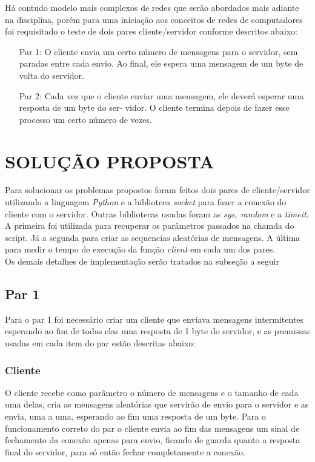 \documentclass[12pt]{article}
\begin{document}
Há contudo modelo mais complexos de redes que serão abordados mais adiante na disciplina,
porém para uma iniciação aos conceitos de redes de computadores foi requisitado o teste de dois pares cliente/servidor
conforme descritos abaixo:
\begin{enumerate}
\item[Par 1:] O cliente envia um certo número de mensagens para o servidor, sem paradas entre cada envio.
Ao final, ele espera uma mensagem de um byte de volta do servidor.\\
\item[Par 2:] Cada vez que o cliente enviar uma mensagem, ele deverá esperar uma resposta de um byte do ser-
vidor.
O cliente termina depois de fazer esse processo um certo número de vezes.
\end{enumerate}

\section{SOLUÇÃO PROPOSTA}
\label{solucao_proposta}

Para solucionar os problemas propostos foram feitos dois pares de cliente/servidor utilizando a linguagem \textit{Python}
e a biblioteca \textit{socket} para fazer a conexão do cliente com o servidor.
Outras bibliotecas usadas foram as \textit{sys, random} e a \textit{timeit}.\\
A primeira foi utilizada para recuperar os parâmetros passados na chamda do script.
Já a segunda para criar as sequencias aleatórias de mensagens. A última
para medir o tempo de execução da função \textit{client} em cada um dos pares.\\
Os demais detalhes de implementação serão tratados na subseção a seguir

\subsection{Par 1}
Para o par 1 foi necessário criar um cliente que enviava mensagens intermitentes esperando ao fim de todas elas
uma resposta de 1 byte do servidor, e as premissas usadas em cada item do par estão descritas abaixo:

\subsubsection{Cliente}
O cliente recebe como parâmetro o número de mensagens e o tamanho de cada uma delas,
cria as mensagens aleatórias que servirão de envio para o servidor e as envia, uma a uma,
esperando ao fim uma resposta de um byte. Para o funcionamento correto do par o cliente envia
ao fim das mensagens um sinal de fechamento da conexão apenas para envio,
ficando de guarda quanto a resposta final do servidor, para só então fechar completamente a conexão.\\
\end{document}
